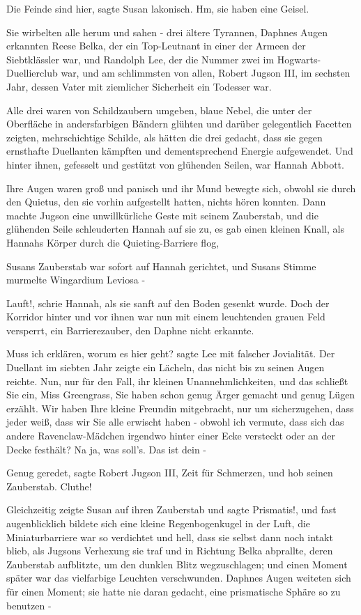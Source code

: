 \glqq Die Feinde sind hier\grqq{}, sagte Susan lakonisch. \glqq Hm, sie haben
eine Geisel.\grqq{}

Sie wirbelten alle herum und sahen - drei ältere Tyrannen, Daphnes Augen
erkannten Reese Belka, der ein Top-Leutnant in einer der Armeen der
Siebtklässler war, und Randolph Lee, der die Nummer zwei im
Hogwarts-Duellierclub war, und am schlimmsten von allen, Robert Jugson III, im
sechsten Jahr, dessen Vater mit ziemlicher Sicherheit ein Todesser war.

Alle drei waren von Schildzaubern umgeben, blaue Nebel, die unter der Oberfläche
in andersfarbigen Bändern glühten und darüber gelegentlich Facetten zeigten,
mehrschichtige Schilde, als hätten die drei gedacht, dass sie gegen ernsthafte
Duellanten kämpften und dementsprechend Energie aufgewendet. Und hinter ihnen,
gefesselt und gestützt von glühenden Seilen, war Hannah Abbott.

Ihre Augen waren groß und panisch und ihr Mund bewegte sich, obwohl sie durch
den Quietus, den sie vorhin aufgestellt hatten, nichts hören konnten. Dann
machte Jugson eine unwillkürliche Geste mit seinem Zauberstab, und die glühenden
Seile schleuderten Hannah auf sie zu, es gab einen kleinen Knall, als Hannahs
Körper durch die Quieting-Barriere flog,

Susans Zauberstab war sofort auf Hannah gerichtet, und Susans Stimme murmelte
\glqq Wingardium Leviosa\grqq{} -

\glqq Lauft!\grqq{}, schrie Hannah, als sie sanft auf den Boden gesenkt wurde.
Doch der Korridor hinter und vor ihnen war nun mit einem leuchtenden grauen Feld
versperrt, ein Barrierezauber, den Daphne nicht erkannte.

\glqq Muss ich erklären, worum es hier geht?\grqq{} sagte Lee mit falscher
Jovialität. Der Duellant im siebten Jahr zeigte ein Lächeln, das nicht bis zu
seinen Augen reichte. \glqq Nun, nur für den Fall, ihr kleinen
Unannehmlichkeiten, und das schließt Sie ein, Miss Greengrass, Sie haben schon
genug Ärger gemacht und genug Lügen erzählt. Wir haben Ihre kleine Freundin
mitgebracht, nur um sicherzugehen, dass jeder weiß, dass wir Sie alle erwischt
haben - obwohl ich vermute, dass sich das andere Ravenclaw-Mädchen irgendwo
hinter einer Ecke versteckt oder an der Decke festhält? Na ja, was soll's. Das
ist dein -\grqq{}

\glqq Genug geredet\grqq{}, sagte Robert Jugson III, \glqq Zeit für
Schmerzen\grqq{}, und hob seinen Zauberstab. \glqq Cluthe!\grqq{}

Gleichzeitig zeigte Susan auf ihren Zauberstab und sagte \glqq
Prismatis!\grqq{}, und fast augenblicklich bildete sich eine kleine
Regenbogenkugel in der Luft, die Miniaturbarriere war so verdichtet und hell,
dass sie selbst dann noch intakt blieb, als Jugsons Verhexung sie traf und in
Richtung Belka abprallte, deren Zauberstab aufblitzte, um den dunklen Blitz
wegzuschlagen; und einen Moment später war das vielfarbige Leuchten
verschwunden. Daphnes Augen weiteten sich für einen Moment; sie hatte nie daran
gedacht, eine prismatische Sphäre so zu benutzen -

